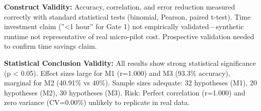 \textbf{Construct Validity:} Accuracy, correlation, and error reduction measured correctly with standard statistical tests (binomial, Pearson, paired t-test). Time investment claim (''<1 hour'' for Gate 1) not empirically validated---synthetic runtime not representative of real micro-pilot cost. Prospective validation needed to confirm time savings claim.

\textbf{Statistical Conclusion Validity:} All results show strong statistical significance (p < 0.05). Effect sizes large for M1 (r=1.000) and M3 (93.3\% accuracy), marginal for M2 (40.91\% vs 40\%). Sample sizes adequate: 32 hypotheses (M1), 20 hypotheses (M2), 30 hypotheses (M3). Risk: Perfect correlation (r=1.000) and zero variance (CV=0.00\%) unlikely to replicate in real data.
